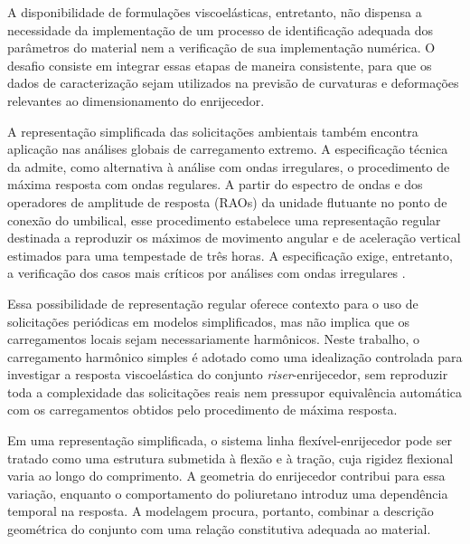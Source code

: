 \documentclass[arial,centeredequations,english,brazilian,oneside,section=TITLE]{ifes8}
\begin{document}
A disponibilidade de formulações viscoelásticas, entretanto, não dispensa a necessidade da implementação de um processo de 
identificação adequada dos parâmetros do material nem a verificação de sua implementação numérica. O desafio consiste em 
integrar essas etapas de maneira consistente, para que os dados de caracterização sejam utilizados na previsão de curvaturas
e deformações relevantes ao dimensionamento do enrijecedor.


A representação simplificada das solicitações ambientais também encontra aplicação nas análises globais de carregamento
extremo. A especificação técnica da  admite, como alternativa à análise
com ondas irregulares, o procedimento de máxima resposta com ondas regulares. A partir do espectro de ondas e dos
operadores de amplitude de resposta (RAOs) da unidade flutuante no ponto de conexão do umbilical, esse procedimento
estabelece uma representação regular destinada a reproduzir os máximos de movimento angular e de aceleração vertical
estimados para uma tempestade de três horas. A especificação exige, entretanto, a verificação dos casos mais críticos
por análises com ondas irregulares \cite{Petrobras2024}.

Essa possibilidade de representação regular oferece contexto para o uso de solicitações periódicas em modelos
simplificados, mas não implica que os carregamentos locais sejam necessariamente harmônicos. Neste trabalho, o
carregamento harmônico simples é adotado como uma idealização controlada para investigar a resposta viscoelástica do
conjunto \emph{riser}-enrijecedor, sem reproduzir toda a complexidade das solicitações reais nem pressupor equivalência
automática com os carregamentos obtidos pelo procedimento de máxima resposta.

Em uma representação simplificada, o sistema linha flexível-enrijecedor pode ser tratado como uma estrutura submetida à 
flexão e à tração, cuja rigidez flexional varia ao longo do comprimento. A geometria do enrijecedor contribui para essa 
variação, enquanto o comportamento do poliuretano introduz uma dependência temporal na resposta. A modelagem procura, 
portanto, combinar a descrição geométrica do conjunto com uma relação constitutiva adequada ao material.
\end{document}
